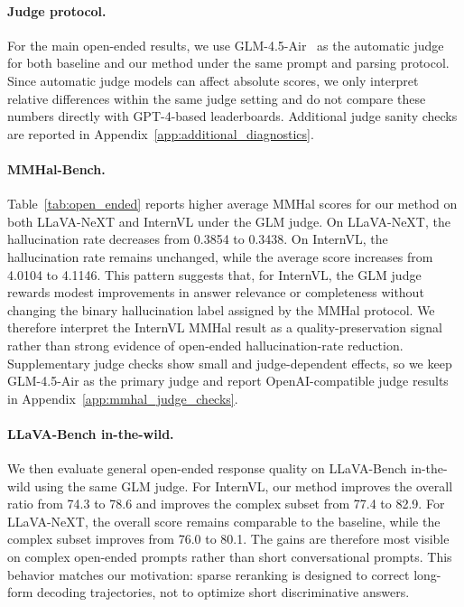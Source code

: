 \documentclass[11pt]{article}
\begin{document}
  \paragraph{Judge protocol.}
  For the main open-ended results, we use GLM-4.5-Air~\citep{glm45arc2025} as the automatic judge for both baseline and our method under the same prompt and parsing protocol.
  Since automatic judge models can affect absolute scores, we only interpret relative differences within the same judge setting and do not compare these numbers directly
  with GPT-4-based leaderboards.
  Additional judge sanity checks are reported in Appendix~\ref{app:additional_diagnostics}.

  \paragraph{MMHal-Bench.}
  Table~\ref{tab:open_ended} reports higher average MMHal scores for our method on both LLaVA-NeXT and InternVL under the GLM judge.
  On LLaVA-NeXT, the hallucination rate decreases from 0.3854 to 0.3438.
  On InternVL, the hallucination rate remains unchanged, while the average score increases from 4.0104 to 4.1146.
  This pattern suggests that, for InternVL, the GLM judge rewards modest improvements in answer relevance or completeness without changing the binary hallucination label assigned by the MMHal protocol.
  We therefore interpret the InternVL MMHal result as a quality-preservation signal rather than strong evidence of open-ended hallucination-rate reduction.
  Supplementary judge checks show small and judge-dependent effects, so we keep GLM-4.5-Air as the primary judge and report OpenAI-compatible judge results in Appendix~\ref{app:mmhal_judge_checks}.

  \paragraph{LLaVA-Bench in-the-wild.}
  We then evaluate general open-ended response quality on LLaVA-Bench in-the-wild using the same GLM judge.
  For InternVL, our method improves the overall ratio from 74.3 to 78.6 and improves the complex subset from 77.4 to 82.9.
  For LLaVA-NeXT, the overall score remains comparable to the baseline, while the complex subset improves from 76.0 to 80.1.
  The gains are therefore most visible on complex open-ended prompts rather than short conversational prompts.
  This behavior matches our motivation: sparse reranking is designed to correct long-form decoding trajectories, not to optimize short discriminative answers.
\end{document}
